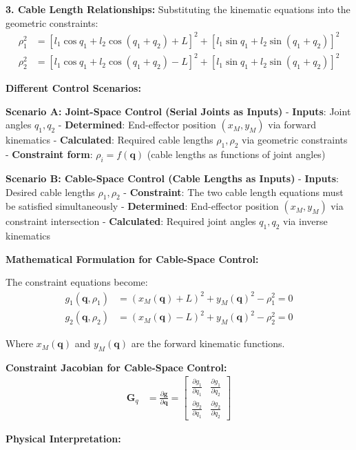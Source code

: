\documentclass[11pt,a4paper]{article}
\begin{document}
\textbf{3. Cable Length Relationships:}
Substituting the kinematic equations into the geometric constraints:
\begin{align}
\rho_1^2 &= [l_1\cos q_1 + l_2\cos(q_1 + q_2) + L]^2 + [l_1\sin q_1 + l_2\sin(q_1 + q_2)]^2 \\
\rho_2^2 &= [l_1\cos q_1 + l_2\cos(q_1 + q_2) - L]^2 + [l_1\sin q_1 + l_2\sin(q_1 + q_2)]^2
\end{align}

\textbf{Different Control Scenarios:}

\textbf{Scenario A: Joint-Space Control (Serial Joints as Inputs)}
- \textbf{Inputs}: Joint angles $q_1, q_2$
- \textbf{Determined}: End-effector position $(x_M, y_M)$ via forward kinematics
- \textbf{Calculated}: Required cable lengths $\rho_1, \rho_2$ via geometric constraints
- \textbf{Constraint form}: $\rho_i = f(\bm{q})$ (cable lengths as functions of joint angles)

\textbf{Scenario B: Cable-Space Control (Cable Lengths as Inputs)}
- \textbf{Inputs}: Desired cable lengths $\rho_1, \rho_2$
- \textbf{Constraint}: The two cable length equations must be satisfied simultaneously
- \textbf{Determined}: End-effector position $(x_M, y_M)$ via constraint intersection
- \textbf{Calculated}: Required joint angles $q_1, q_2$ via inverse kinematics

\textbf{Mathematical Formulation for Cable-Space Control:}

The constraint equations become:
\begin{align}
g_1(\bm{q}, \rho_1) &= (x_M(\bm{q}) + L)^2 + y_M(\bm{q})^2 - \rho_1^2 = 0 \\
g_2(\bm{q}, \rho_2) &= (x_M(\bm{q}) - L)^2 + y_M(\bm{q})^2 - \rho_2^2 = 0
\end{align}

Where $x_M(\bm{q})$ and $y_M(\bm{q})$ are the forward kinematic functions.

\textbf{Constraint Jacobian for Cable-Space Control:}
\begin{align}
\bm{G}_q &= \frac{\partial \bm{g}}{\partial \bm{q}} = \begin{bmatrix}
\frac{\partial g_1}{\partial q_1} & \frac{\partial g_1}{\partial q_2} \\
\frac{\partial g_2}{\partial q_1} & \frac{\partial g_2}{\partial q_2}
\end{bmatrix}
\end{align}

\textbf{Physical Interpretation:}
\end{document}
